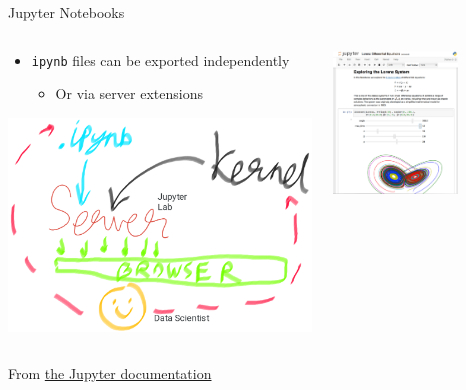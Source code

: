 \documentclass[bigger,unknownkeysallowed,aspectratio=169,red,colorblocks]{beamer}
\begin{document}
\begin{frame}[label={sec:org58a9aef},fragile]{Jupyter Notebooks}
 \begin{columns}
\begin{column}{0.5\columnwidth}
\begin{itemize}
\item \texttt{ipynb} files can be exported independently
\begin{itemize}
\item Or via server extensions
\end{itemize}
\end{itemize}
\begin{center}
\includegraphics[width=.9\linewidth]{images/A_block/2020-09-20_10-34-58_screenshot.png}
\end{center}
\end{column}

\begin{column}{0.5\columnwidth}
\begin{center}
\includegraphics[width=0.7\textwidth]{images/A_screenshot/2020-09-20_09-14-03_screenshot.png}
\end{center}
\end{column}
\end{columns}

From \href{https://jupyter.readthedocs.io/en/latest/projects/architecture/content-architecture.html}{the Jupyter documentation}
\end{frame}
\end{document}
